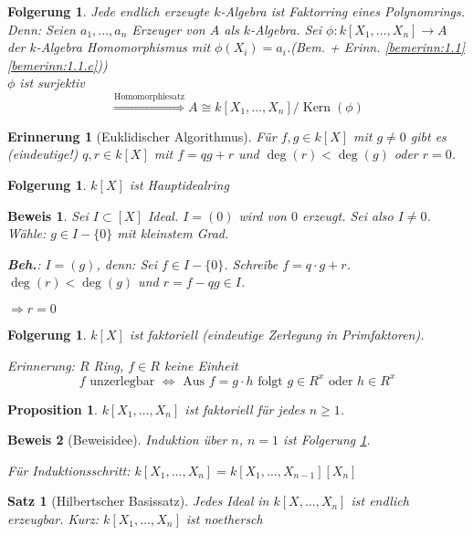 \documentclass[a4paper, 12pt, numbers=noendperiod, chapterprefix=true, headsepline]{scrbook}
\theoremstyle{break}
\newtheorem{Satz}{Satz}
\newtheorem{Erinn}[Def]{Erinnerung}
\newtheorem{Prop}[Def]{Proposition}
\newtheorem{Folg}[Def]{Folgerung}
\theoremstyle{nonumberbreak}
\newtheorem{Bew}{Beweis}
\theoremstyle{nonumberplain}
\DeclareMathOperator{\Kern}{Kern}
\begin{document}
\begin{Folg}\label{folg1.2}
Jede endlich erzeugte $k$-Algebra ist Faktorring eines Polynomrings.\\
	\emph{Denn:} Seien $a_1,\dots, a_n$ Erzeuger von $A$ als $k$-Algebra. Sei $\phi:k[X_1,\dots,X_n] \to A$ \emph{der} $k$-Algebra Homomorphismus mit $\phi(X_i) = a_i$.(Bem. + Erinn. \ref{bemerinn:1.1} \ref{bemerinn:1.1.c}))\\
	$\phi$ ist surjektiv \[\overset{\textrm{Homomorphiesatz}}{\Longrightarrow} A \cong k[X_1,\dots, X_n]/\Kern(\phi)\]
\end{Folg}

\begin{Erinn}[Euklidischer Algorithmus]
F\"ur $f,g\in k[X]$ mit $g\not= 0$ gibt es (eindeutige!) $q,r \in k[X]$ mit $f=qg+r$ und $\deg(r) < \deg(g)$ oder $r=0$.
\end{Erinn}

\begin{Folg}
$k[X]$ ist Hauptidealring
\end{Folg}

\begin{Bew}
Sei $I \subset[X]$ Ideal. $I = (0)$ wird von $0$ erzeugt. Sei also $I\not=0$. W\"ahle: $g \in I-\{0\}$ mit kleinstem Grad.

\textbf{Beh.}: $I = (g)$, \emph{denn:} Sei $f\in I-\{0\}$. Schreibe $f=q\cdot g+r$. $\deg(r)<\deg(g)$ und $r=f-qg \in I$.

$\Rightarrow r=0$
\end{Bew}

\begin{Folg}\label{folg:1.5}
$k[X]$ ist faktoriell (eindeutige Zerlegung in Primfaktoren).

\emph{Erinnerung}: $R$ Ring, $f \in R$ keine Einheit
	\[f \textrm{ unzerlegbar } \Leftrightarrow \textrm{ Aus } f = g\cdot h \textrm{ folgt } g \in R^x \textrm{ oder } h\in R^x\]
\end{Folg}

\begin{Prop}
$k[X_1, \dots, X_n]$ ist faktoriell f\"ur jedes $n\ge 1$.
\end{Prop}

\begin{Bew}[Beweisidee]
Induktion \"uber $n$, $n = 1$ ist Folgerung \ref{folg:1.5}.

F\"ur Induktionsschritt: $k[X_1,\dots, X_n] = k[X_1,\dots,X_{n-1}][X_n]$
\end{Bew}

\begin{Satz}[Hilbertscher Basissatz]\label{satz1}
Jedes Ideal in $k[X,\dots ,X_n]$ ist endlich erzeugbar. \emph{Kurz:} $k[X_1,\dots, X_n]$ ist noethersch
\end{Satz}
\end{document}
